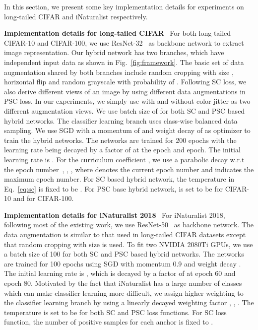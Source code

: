 \documentclass[final]{cvpr}
\begin{document}
In this section, we present some key implementation details for experiments on long-tailed CIFAR and iNaturalist respectively.

\noindent 
\par{\textbf{Implementation details for long-tailed CIFAR}}~
For both long-tailed CIFAR-10 and CIFAR-100, we use ResNet-32~\cite{resnet} as backbone network to extract image representation. Our hybrid network has two branches, which have independent input data as shown in Fig.~\ref{fig:framework}. The basic set of data augmentation shared by both branches include random cropping with size , horizontal flip and random grayscale with probability of . Following SC loss, we also derive different views of an image by using different data augmentations in PSC loss. In our experiments, we simply use with and without color jitter as two different augmentation views. We use batch size of  for both SC and PSC based hybrid networks. The classifier learning branch uses class-wise balanced data sampling. We use SGD with a momentum of  and weight decay of  as optimizer to train the hybrid networks. The networks are trained for 200 epochs with the learning rate being decayed by a factor of  at the  epoch and  epoch. The initial learning rate is . For the curriculum coefficient , we use a parabolic decay w.r.t the epoch number~\cite{BBN}, \ie, , where  denotes the current epoch number and  indicates the maximum epoch number. For SC based hybrid network, the temperature  in Eq.~\eqref{eq:sc} is fixed to be . For PSC base hybrid network,  is set to be  for CIFAR-10 and  for CIFAR-100.

\par{\textbf{Implementation details for iNaturalist 2018}}~
For iNaturalist 2018, following most of the existing work, we use ResNet-50~\cite{resnet} as backbone network. The data augmentation is similar to that used in long-tailed CIFAR datasets except that random cropping with size  is used. To fit two NVIDIA 2080Ti GPUs, we use a batch size of 100 for both SC and PSC based hybrid networks. The networks are trained for 100 epochs using SGD with momentum 0.9 and weight decay . The initial learning rate is , which is decayed by a factor of  at epoch 60 and epoch 80. Motivated by the fact that iNaturalist has a large number of classes which can make classifier learning more difficult, we assign higher weighting to the classifier learning branch by using a linearly decayed weighting factor , \ie, . The temperature  is set to be  for both SC and PSC loss functions. For SC loss function, the number of positive samples for each anchor is fixed to .
\end{document}
